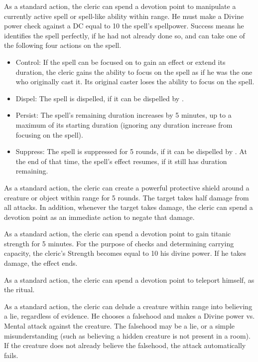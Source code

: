     As a standard action, the cleric can spend a devotion point to manipulate a currently active spell or spell-like ability within \rngmed range.
    He must make a Divine power check against a DC equal to 10 \add the spell's spellpower.
    Success means he identifies the spell perfectly, if he had not already done so, and can take one of the following four actions on the spell.
    \begin{itemize}
        \item Control: If the spell can be focused on to gain an effect or extend its duration, the cleric gains the ability to focus on the spell as if he was the one who originally cast it.
            Its original caster loses the ability to focus on the spell.
        \item Dispel: The spell is dispelled, if it can be dispelled by .
        \item Persist: The spell's remaining duration increases by 5 minutes, up to a maximum of its starting duration (ignoring any duration increase from focusing on the spell).
        \item Suppress: The spell is suppressed for 5 rounds, if it can be dispelled by .
            At the end of that time, the spell's effect resumes, if it still has duration remaining.
    \end{itemize}

    As a standard action, the cleric can create a powerful protective shield around a creature or object within \rngclose range for 5 rounds.
    The target takes half damage from all attacks.
    In addition, whenever the target takes damage, the cleric can spend a devotion point as an immediate action to negate that damage.

    As a standard action, the cleric can spend a devotion point to gain titanic strength for 5 minutes.
    For the purpose of checks and determining carrying capacity, the cleric's Strength becomes equal to 10 \add his divine power.
    If he takes damage, the effect ends.

    As a standard action, the cleric can spend a devotion point to teleport himself, as the  ritual.

    As a standard action, the cleric can delude a creature within \rngmed range into believing a lie, regardless of evidence.
    He chooses a falsehood and makes a Divine power vs. Mental attack against the creature.
    The falsehood may be a lie, or a simple misunderstanding (such as believing a hidden creature is not present in a room).
    If the creature does not already believe the falsehood, the attack automatically fails.

